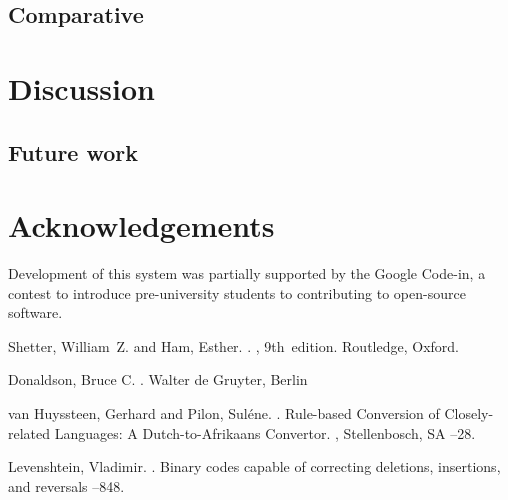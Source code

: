 \documentclass[11pt]{article}
\newcommand{\confname}{EAMT 2011}
\begin{document}
\subsection{Comparative}



\section{Discussion}

\subsection{Future work}

\section*{Acknowledgements}

Development of this system was partially supported by the Google Code-in,
a contest to introduce pre-university students to contributing to open-source
software.

% 

\begin{thebibliography}{}

Shetter, William~Z. and Ham, Esther.
.
, 9th~edition.
\newblock Routledge, Oxford.

Donaldson, Bruce C.
.
\newblock Walter de Gruyter, Berlin

van Huyssteen, Gerhard and Pilon, Suléne.
. 
\newblock Rule-based Conversion of Closely-related Languages: A Dutch-to-Afrikaans Convertor. 
, Stellenbosch, SA
--28.

Levenshtein, Vladimir.
. 
\newblock Binary codes capable of correcting deletions, insertions, and reversals
--848.


\end{thebibliography}
\end{document}
